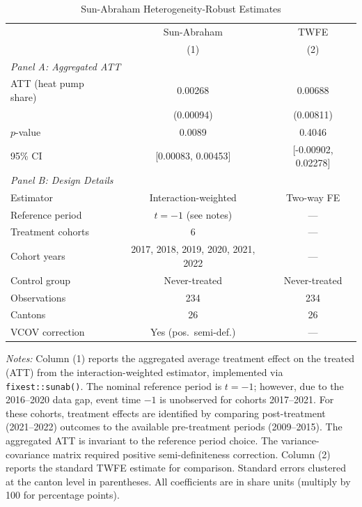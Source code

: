 \begin{table}[!htbp]
\centering
\caption{Sun-Abraham Heterogeneity-Robust Estimates}
\label{tab:sunab}
\begin{tabular}{lcc}
\toprule
 & Sun-Abraham & TWFE \\
 & (1) & (2) \\
\midrule
\multicolumn{3}{l}{\textit{Panel A: Aggregated ATT}} \\[3pt]
ATT (heat pump share) & 0.00268 & 0.00688 \\
 & (0.00094) & (0.00811) \\
$p$-value & 0.0089 & 0.4046 \\
95\% CI & [0.00083, 0.00453] & [-0.00902, 0.02278] \\
\midrule
\multicolumn{3}{l}{\textit{Panel B: Design Details}} \\[3pt]
Estimator & Interaction-weighted & Two-way FE \\
Reference period & $t = -1$ (see notes) & --- \\
Treatment cohorts & 6 & --- \\
Cohort years & 2017, 2018, 2019, 2020, 2021, 2022 & --- \\
Control group & Never-treated & Never-treated \\
Observations & 234 & 234 \\
Cantons & 26 & 26 \\
VCOV correction & Yes (pos.\ semi-def.) & --- \\
\bottomrule
\end{tabular}
\begin{minipage}{0.92\textwidth}
\vspace{6pt}
\footnotesize
\textit{Notes:} Column (1) reports the aggregated average treatment effect on the treated (ATT) from the \citet{sun2021estimating} interaction-weighted estimator, implemented via \texttt{fixest::sunab()}. The nominal reference period is $t = -1$; however, due to the 2016--2020 data gap, event time $-1$ is unobserved for cohorts 2017--2021. For these cohorts, treatment effects are identified by comparing post-treatment (2021--2022) outcomes to the available pre-treatment periods (2009--2015). The aggregated ATT is invariant to the reference period choice. The variance-covariance matrix required positive semi-definiteness correction. Column (2) reports the standard TWFE estimate for comparison. Standard errors clustered at the canton level in parentheses. All coefficients are in share units (multiply by 100 for percentage points).
\end{minipage}
\end{table}
